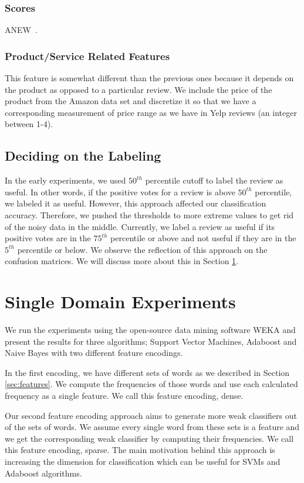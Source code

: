 \documentclass[letterpaper]{article}
\begin{document}
\subsubsection{Scores}
ANEW~\cite{DoddsANEWPaper}.

\subsubsection{Product/Service Related Features} 
This feature is somewhat different than the previous ones
because it depends on the product as opposed to a particular
review. We include the price of the product from the Amazon data set and
discretize it so that we have a corresponding measurement of price
range as we have in Yelp reviews (an integer between 1-4). 

\subsection{Deciding on the Labeling}
In the early experiments, we used $50^{th}$ percentile cutoff to label the
review as useful. In other words, if the positive votes for a review is above
$50^{th}$ percentile, we labeled it as useful. However, this approach affected our classification
accuracy. Therefore, we pushed the thresholds to more extreme values
to get rid of the noisy data in the middle. Currently, we label a review as useful
if its positive votes are in the $75^{th}$ percentile or above and not
useful if they are 
in the $5^{th}$ percentile or below. We observe the reflection of this
approach on the confusion matrices. We will discuss more about this in
Section \ref{sec:single_domain}.


\section{Single Domain Experiments}
\label{sec:single_domain}  
We run the experiments using the open-source data mining software WEKA \cite{weka}
and present the results for three algorithms; Support Vector Machines, Adaboost and
Naive Bayes with two different feature encodings. 

In the first encoding, we have different sets of words as we described in
Section \ref{sec:features}. We compute the frequencies of those
words and use each calculated frequency as a single feature. We call
this feature encoding, dense. 

Our second feature encoding approach aims to generate more weak
classifiers out of the sets of words. We assume every single word from
these sets is a feature and we get the corresponding weak classifier
by computing their frequencies. We call this feature encoding,
sparse. The main motivation behind this approach is increasing the
dimension for classification which can be useful for SVMs and Adaboost
algorithms.
\end{document}
